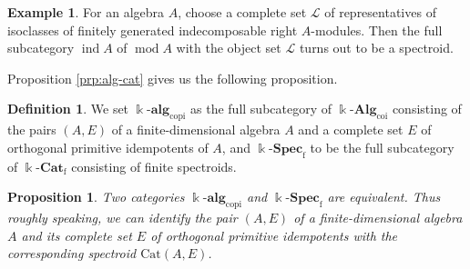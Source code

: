 \documentclass{surv-l}
\numberwithin{equation}{chapter}
\numberwithin{figure}{chapter}
\theoremstyle{plain}
\newtheorem{prp}[thm]{Proposition}
\theoremstyle{definition}
\newtheorem{dfn}[thm]{Definition}
\newtheorem{exm}[thm]{Example}
\theoremstyle{remark}
\newcommand{\kCat}{\Bbbk\text{-}\mathbf{Cat}}
\DeclareMathOperator{\ind}{ind}
\begin{document}
\begin{exm}
For an algebra $A$, choose a complete set $\mathcal{L}$ of representatives of isoclasses
of finitely generated indecomposable right $A$-modules.
Then the full subcategory $\ind A$ of $\operatorname{mod} A$ with the object set $\mathcal{L}$
turns out to be a spectroid.
\end{exm}

Proposition \ref{prp:alg-cat} gives us the following proposition.

\begin{dfn}
We set $\Bbbk\text{-}\mathbf{alg}_{\mathrm{copi}}$ as the full subcategory of $\Bbbk\text{-}\mathbf{Alg}_{\mathrm{coi}}$ consisting of
the pairs $(A, E)$ of a finite-dimensional algebra $A$ and a complete set $E$ of
orthogonal primitive idempotents of $A$,
and $\Bbbk\text{-}\mathbf{Spec}_{\mathrm{f}}$ to be the full subcategory of $\kCat_{\mathrm{f}}$ consisting of
finite spectroids.
\end{dfn}

\begin{prp}
Two categories $\Bbbk\text{-}\mathbf{alg}_{\mathrm{copi}}$ and $\Bbbk\text{-}\mathbf{Spec}_{\mathrm{f}}$ are equivalent.
Thus roughly speaking,
we can identify the pair $(A, E)$ of a finite-dimensional algebra $A$
and its complete set $E$ of orthogonal primitive idempotents
with the corresponding spectroid $\mathrm{Cat}(A, E)$.
\end{prp}
\end{document}
